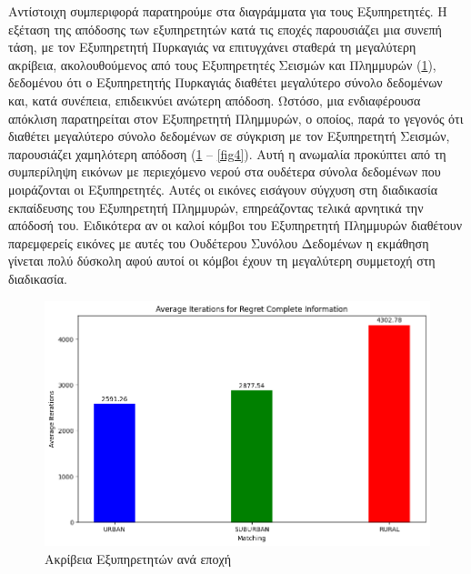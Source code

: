Αντίστοιχη συμπεριφορά παρατηρούμε στα διαγράμματα για τους Εξυπηρετητές. Η εξέταση της απόδοσης των εξυπηρετητών κατά τις εποχές παρουσιάζει μια συνεπή τάση, με τον Εξυπηρετητή Πυρκαγιάς να επιτυγχάνει σταθερά τη μεγαλύτερη ακρίβεια, ακολουθούμενος από τους Εξυπηρετητές Σεισμών και Πλημμυρών (\ref{fig3}), δεδομένου ότι ο Εξυπηρετητής Πυρκαγιάς διαθέτει μεγαλύτερο σύνολο δεδομένων και, κατά συνέπεια, επιδεικνύει ανώτερη απόδοση. Ωστόσο, μια ενδιαφέρουσα απόκλιση παρατηρείται στον Εξυπηρετητή Πλημμυρών, ο οποίος, παρά το γεγονός ότι διαθέτει μεγαλύτερο σύνολο δεδομένων σε σύγκριση με τον Εξυπηρετητή Σεισμών, παρουσιάζει χαμηλότερη απόδοση (\ref{fig3} – \ref{fig4}). Αυτή η ανωμαλία προκύπτει από τη συμπερίληψη εικόνων με περιεχόμενο νερού στα ουδέτερα σύνολα δεδομένων που μοιράζονται οι Εξυπηρετητές. Αυτές οι εικόνες εισάγουν σύγχυση στη διαδικασία εκπαίδευσης του Εξυπηρετητή Πλημμυρών, επηρεάζοντας τελικά αρνητικά την απόδοσή του. Ειδικότερα αν οι καλοί κόμβοι του Εξυπηρετητή Πλημμυρών διαθέτουν παρεμφερείς εικόνες με αυτές του Ουδέτερου Συνόλου Δεδομένων η εκμάθηση γίνεται πολύ δύσκολη αφού αυτοί οι κόμβοι έχουν τη μεγαλύτερη συμμετοχή στη διαδικασία.

\begin{figure}[ht]
    \centering
    \includegraphics[width=\textwidth]{figures/chapter4/Average_Iterations_per_area_RCI.png}
    \caption{Ακρίβεια Εξυπηρετητών ανά εποχή}
    \label{fig3}
\end{figure}

\newpage

